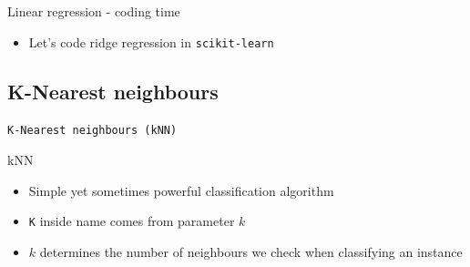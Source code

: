 \documentclass[aspectratio=169]{beamer}
\begin{document}
\begin{frame}{Linear regression - coding time}
    \begin{itemize}
        \item Let's code ridge regression in \texttt{scikit-learn}
    \end{itemize}
\end{frame}


\subsection{K-Nearest neighbours}
\begin{frame}{}
    \begin{center}
        \Large{\texttt{K-Nearest neighbours (kNN)}}
    \end{center}
\end{frame}
\begin{frame}{kNN}
    \begin{itemize}
        \item Simple yet sometimes powerful classification algorithm
        \item \texttt{K} inside name comes from parameter $k$
        \item $k$ determines the number of neighbours we check when classifying an instance
    \end{itemize}
\end{frame}
\end{document}

